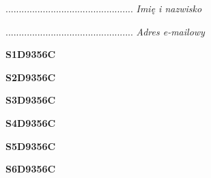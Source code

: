 \begin{turn}{90}\begin{minipage}{\linewidth} \vspace{20mm} ................................................  \textit{Imię i nazwisko}\end{minipage}\end{turn}

\begin{turn}{90}\begin{minipage}{\linewidth} \vspace{20mm} ................................................  \textit{Adres e-mailowy}\end{minipage}\end{turn}

\begin{turn}{90}\huge \begin{minipage}{\linewidth} \vspace{10mm}\textbf{S1D9356C}\end{minipage}\end{turn}

\begin{turn}{90}\huge \begin{minipage}{\linewidth} \vspace{10mm}\textbf{S2D9356C}\end{minipage}\end{turn}

\begin{turn}{90}\huge \begin{minipage}{\linewidth} \vspace{10mm}\textbf{S3D9356C}\end{minipage}\end{turn}

\begin{turn}{90}\huge \begin{minipage}{\linewidth} \vspace{10mm}\textbf{S4D9356C}\end{minipage}\end{turn}

\begin{turn}{90}\huge \begin{minipage}{\linewidth} \vspace{10mm}\textbf{S5D9356C}\end{minipage}\end{turn}

\begin{turn}{90}\huge \begin{minipage}{\linewidth} \vspace{10mm}\textbf{S6D9356C}\end{minipage}\end{turn}

